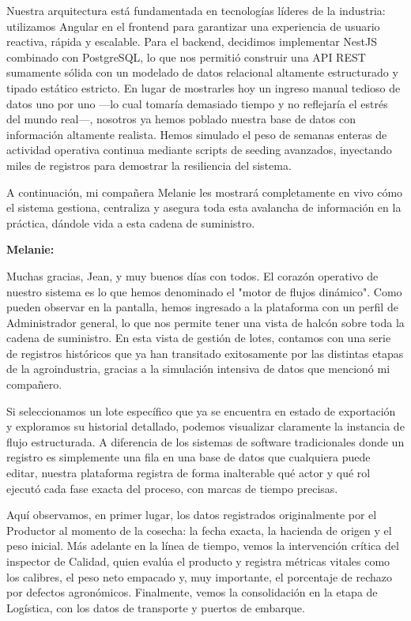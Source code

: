 \documentclass[12pt,a4paper]{article}
\begin{document}
Nuestra arquitectura está fundamentada en tecnologías líderes de la industria: utilizamos Angular en el frontend para garantizar una experiencia de usuario reactiva, rápida y escalable. Para el backend, decidimos implementar NestJS combinado con PostgreSQL, lo que nos permitió construir una API REST sumamente sólida con un modelado de datos relacional altamente estructurado y tipado estático estricto. En lugar de mostrarles hoy un ingreso manual tedioso de datos uno por uno —lo cual tomaría demasiado tiempo y no reflejaría el estrés del mundo real—, nosotros ya hemos poblado nuestra base de datos con información altamente realista. Hemos simulado el peso de semanas enteras de actividad operativa continua mediante scripts de seeding avanzados, inyectando miles de registros para demostrar la resiliencia del sistema. 

A continuación, mi compañera Melanie les mostrará completamente en vivo cómo el sistema gestiona, centraliza y asegura toda esta avalancha de información en la práctica, dándole vida a esta cadena de suministro.

\textbf{Melanie:}

Muchas gracias, Jean, y muy buenos días con todos. El corazón operativo de nuestro sistema es lo que hemos denominado el "motor de flujos dinámico". Como pueden observar en la pantalla, hemos ingresado a la plataforma con un perfil de Administrador general, lo que nos permite tener una vista de halcón sobre toda la cadena de suministro. En esta vista de gestión de lotes, contamos con una serie de registros históricos que ya han transitado exitosamente por las distintas etapas de la agroindustria, gracias a la simulación intensiva de datos que mencionó mi compañero.

Si seleccionamos un lote específico que ya se encuentra en estado de exportación y exploramos su historial detallado, podemos visualizar claramente la instancia de flujo estructurada. A diferencia de los sistemas de software tradicionales donde un registro es simplemente una fila en una base de datos que cualquiera puede editar, nuestra plataforma registra de forma inalterable qué actor y qué rol ejecutó cada fase exacta del proceso, con marcas de tiempo precisas. 

Aquí observamos, en primer lugar, los datos registrados originalmente por el Productor al momento de la cosecha: la fecha exacta, la hacienda de origen y el peso inicial. Más adelante en la línea de tiempo, vemos la intervención crítica del inspector de Calidad, quien evalúa el producto y registra métricas vitales como los calibres, el peso neto empacado y, muy importante, el porcentaje de rechazo por defectos agronómicos. Finalmente, vemos la consolidación en la etapa de Logística, con los datos de transporte y puertos de embarque. 
\end{document}
